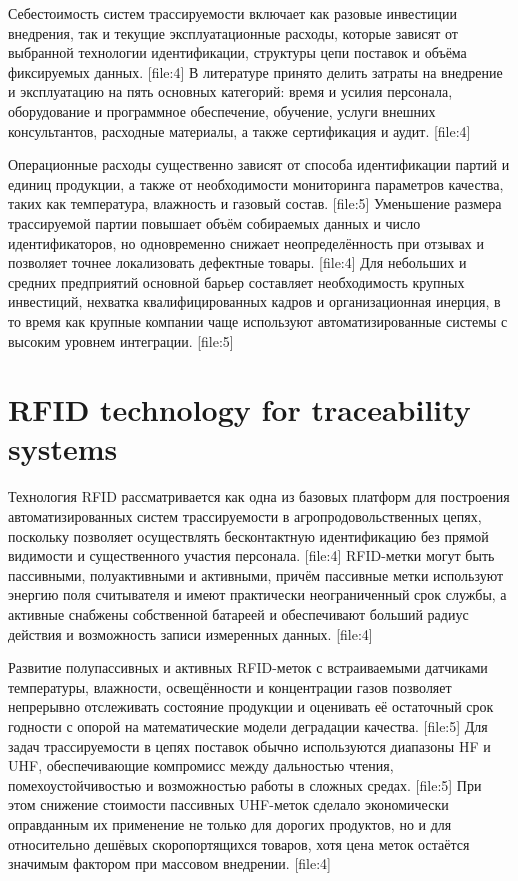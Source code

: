 \documentclass[eng]{ajceam-class}
\begin{document}
Себестоимость систем трассируемости включает как разовые инвестиции внедрения, так и текущие эксплуатационные расходы, которые зависят от выбранной технологии идентификации, структуры цепи поставок и объёма фиксируемых данных. [file:4] В литературе принято делить затраты на внедрение и эксплуатацию на пять основных категорий: время и усилия персонала, оборудование и программное обеспечение, обучение, услуги внешних консультантов, расходные материалы, а также сертификация и аудит. [file:4]

Операционные расходы существенно зависят от способа идентификации партий и единиц продукции, а также от необходимости мониторинга параметров качества, таких как температура, влажность и газовый состав. [file:5] Уменьшение размера трассируемой партии повышает объём собираемых данных и число идентификаторов, но одновременно снижает неопределённость при отзывах и позволяет точнее локализовать дефектные товары. [file:4] Для небольших и средних предприятий основной барьер составляет необходимость крупных инвестиций, нехватка квалифицированных кадров и организационная инерция, в то время как крупные компании чаще используют автоматизированные системы с высоким уровнем интеграции. [file:5]

\section{RFID technology for traceability systems}

Технология RFID рассматривается как одна из базовых платформ для построения автоматизированных систем трассируемости в агропродовольственных цепях, поскольку позволяет осуществлять бесконтактную идентификацию без прямой видимости и существенного участия персонала. [file:4] RFID\mbox{-}метки могут быть пассивными, полуактивными и активными, причём пассивные метки используют энергию поля считывателя и имеют практически неограниченный срок службы, а активные снабжены собственной батареей и обеспечивают больший радиус действия и возможность записи измеренных данных. [file:4]

Развитие полупассивных и активных RFID\mbox{-}меток с встраиваемыми датчиками температуры, влажности, освещённости и концентрации газов позволяет непрерывно отслеживать состояние продукции и оценивать её остаточный срок годности с опорой на математические модели деградации качества. [file:5] Для задач трассируемости в цепях поставок обычно используются диапазоны HF и UHF, обеспечивающие компромисс между дальностью чтения, помехоустойчивостью и возможностью работы в сложных средах. [file:5] При этом снижение стоимости пассивных UHF\mbox{-}меток сделало экономически оправданным их применение не только для дорогих продуктов, но и для относительно дешёвых скоропортящихся товаров, хотя цена меток остаётся значимым фактором при массовом внедрении. [file:4]
\end{document}
